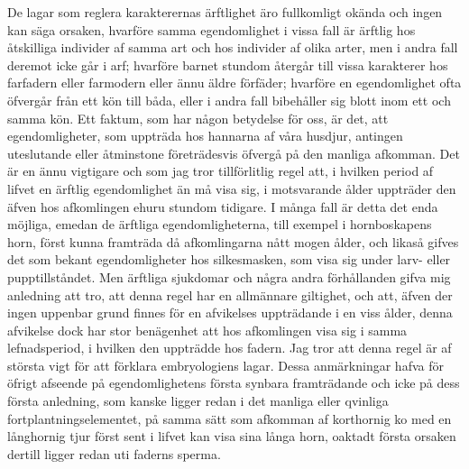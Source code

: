 De lagar som reglera karakterernas ärftlighet äro fullkomligt okända och ingen kan säga orsaken, hvarföre samma egendomlighet i vissa fall är ärftlig hos åtskilliga individer af samma art och hos individer af olika arter, men i andra fall deremot icke går i arf; hvarföre barnet stundom återgår till vissa karakterer hos farfadern eller farmodern eller ännu äldre förfäder; hvarföre en egendomlighet ofta öfvergår från ett kön till båda, eller i andra fall bibehåller sig blott inom ett och samma kön. Ett faktum, som har någon betydelse för oss, är det, att egendomligheter, som uppträda hos hannarna af våra husdjur, antingen uteslutande eller åtminstone företrädesvis öfvergå på den manliga afkomman. Det är en ännu vigtigare och som jag tror tillförlitlig regel att, i hvilken period af lifvet en ärftlig egendomlighet än må visa sig, i motsvarande ålder uppträder den äfven hos afkomlingen ehuru stundom tidigare. I många fall är detta det enda möjliga, emedan de ärftliga egendomligheterna, till exempel i hornboskapens horn, först kunna framträda då afkomlingarna nått mogen ålder, och likaså gifves det som bekant egendomligheter hos silkesmasken, som visa sig under larv- eller pupptillståndet. Men ärftliga sjukdomar och några andra förhållanden gifva mig anledning att tro, att denna regel har en allmännare giltighet, och att, äfven der ingen uppenbar grund finnes för en afvikelses uppträdande i en viss ålder, denna afvikelse dock har stor benägenhet att hos afkomlingen visa sig i samma lefnadsperiod, i hvilken den uppträdde hos fadern. Jag tror att denna regel är af största vigt för att förklara embryologiens lagar. Dessa anmärkningar hafva för öfrigt afseende på egendomlighetens första synbara framträdande och icke på dess första anledning, som kanske ligger redan i det manliga eller qvinliga fortplantningselementet, på samma sätt som afkomman af korthornig ko med en långhornig tjur först sent i lifvet kan visa sina långa horn, oaktadt första orsaken dertill ligger redan uti faderns sperma.

